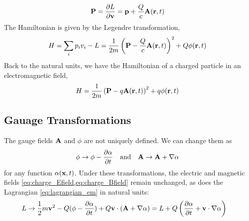 \begin{align}
    \mathbf{P} = \frac{\partial L}{\partial \mathbf{v}} = \mathbf{p} + \frac{Q}{c} \mathbf{A}(\mathbf{r},t)
\end{align}
The Hamiltonian is given by the Legendre transformation,
\begin{align}
    H = \sum_i p_i v_i - L = \frac{1}{2m} \left( \mathbf{P} - \frac{Q}{c} \mathbf{A}(\mathbf{r},t) \right)^2 + Q \phi(\mathbf{r},t)
\end{align}
Back to the natural units, we have the Hamiltonian of a charged particle in an electromagnetic field,
\begin{align}
    H = \frac{1}{2m} \left( \mathbf{P} - q \mathbf{A}(\mathbf{r},t) \right)^2 + q \phi(\mathbf{r},t)
\end{align}
\subsection{Gauage Transformations}
The gauge fields $\mathbf{A}$ and $\phi$ are not uniquely defined. We can change them as 
\begin{align}
    \phi \rightarrow \phi - \frac{\partial \alpha}{\partial t} \quad \text{and} \quad \mathbf{A} \rightarrow \mathbf{A} + \nabla \alpha
\end{align}
for any function $\alpha(\mathbf{x},t)$. Under these transformations, the electric and magnetic fields \cref{eq:charge_Efield,eq:charge_Bfield} remain unchanged, as does the Lagrangian \cref{eq:lagrangian_em} in natural units: 
\begin{align*}
    L & \rightarrow \frac{1}{2} m \mathbf{v}^2 - Q (\phi - \frac{\partial \alpha}{\partial t}) + Q\mathbf{v} \cdot (\mathbf{A} + \nabla \alpha) = L + Q \left( \frac{\partial \alpha}{\partial t} + \mathbf{v} \cdot \nabla \alpha \right) 
\end{align*}






